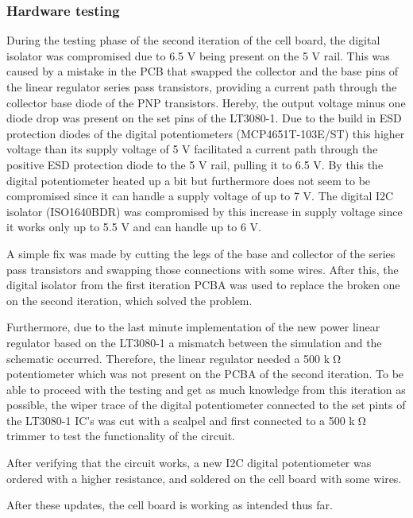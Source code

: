 \subsubsection{Hardware testing}
During the testing phase of the second iteration of the cell board, the digital isolator was compromised due to 6.5 V being present on the 5 V rail. This was caused by a mistake in the PCB that swapped the collector and the base pins of the linear regulator series pass transistors, providing a current path through the collector base diode of the PNP transistors. Hereby, the output voltage minus one diode drop was present on the set pins of the LT3080-1. Due to the build in ESD protection diodes of the digital potentiometers (MCP4651T-103E/ST) this higher voltage than its supply voltage of 5 V facilitated a current path through the positive ESD protection diode to the 5 V rail, pulling it to 6.5 V. By this the digital potentiometer heated up a bit but furthermore does not seem to be compromised since it can handle a supply voltage of up to 7 V. The digital I2C isolator (ISO1640BDR) was compromised by this increase in supply voltage since it works only up to 5.5 V and can handle up to 6 V. 

A simple fix was made by cutting the legs of the base and collector of the series pass transistors and swapping those connections with some wires. After this, the digital isolator from the first iteration PCBA was used to replace the broken one on the second iteration, which solved the problem.

Furthermore, due to the last minute implementation of the new power linear regulator based on the LT3080-1 a mismatch between the simulation and the schematic occurred. Therefore, the linear regulator needed a 500 k$\tcohm$ potentiometer which was not present on the PCBA of the second iteration. To be able to proceed with the testing and get as much knowledge from this iteration as possible, the wiper trace of the digital potentiometer connected to the set pints of the LT3080-1 IC's was cut with a scalpel and first connected to a 500 k$\tcohm$ trimmer to test the functionality of the circuit.

After verifying that the circuit works, a new I2C digital potentiometer was ordered with a higher resistance, and soldered on the cell board with some wires.

After these updates, the cell board is working as intended thus far.